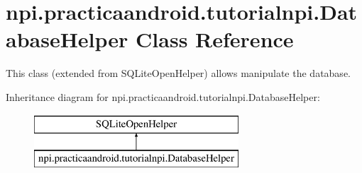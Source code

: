 \hypertarget{classnpi_1_1practicaandroid_1_1tutorialnpi_1_1_database_helper}{\section{npi.\-practicaandroid.\-tutorialnpi.\-Database\-Helper Class Reference}
\label{classnpi_1_1practicaandroid_1_1tutorialnpi_1_1_database_helper}
}


This class (extended from S\-Q\-Lite\-Open\-Helper) allows manipulate the database.  


Inheritance diagram for npi.\-practicaandroid.\-tutorialnpi.\-Database\-Helper\-:\begin{figure}[H]
\begin{center}
\leavevmode
\includegraphics[height=2.000000cm]{classnpi_1_1practicaandroid_1_1tutorialnpi_1_1_database_helper}
\end{center}
\end{figure}
